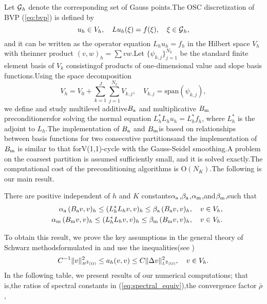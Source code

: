 \documentclass{report}
\begin{document}
Let $\mbox{${\cal G}$}_h$ denote the corresponding set of Gauss points.The OSC discretization of BVP (\ref{eq:bvp}) is defined by\begin{equation}\label{eq:osc}u_h\in V_h,\quad Lu_h(\xi)=f(\xi),\quad\xi\in\mbox{${\cal G}$}_h,\end{equation}and it can be written as the operator equation $L_hu_h=f_h$ in the Hilbert space $V_h$ with theinner product $(v,w)_h=\sum vw$.Let $\{\psi_{k,j}\}_{j=1}^{N_k}$ be the standard finite element basis of $V_k$ consistingof products of one-dimensional value and slope basis functions.Using the space decomposition\[V_h=V_0+\sum_{k=1}^{J}\sum_{j=1}^{N_k}V_{k,j},
\quad V_{k,j} = \mbox{span}(\psi_{k,j}),\]we define and study multilevel additive$B_{\textup{\scriptsize a}}$ and multiplicative $B_{\textup{\scriptsize m}}$ preconditionersfor solving the normal equation $L_h^*L_hu_h=L_h^*f_h$,
where $L_h^*$ is the adjoint to $L_h$.The implementation of $B_{\textup{\scriptsize a}}$ and $B_{\textup{\scriptsize m}}$is based on relationships between basis functions for two consecutive partitionsand the implementation of $B_{\textup{\scriptsize m}}$ is similar to that forV(1,1)-cycle with the Gauss-Seidel smoothing.A problem on the coarsest partition is assumed sufficiently small,
and it is solved exactly.The computational cost of the preconditioning algorithms is $\mbox{O}(N_K)$.The following is our main result.\begin{theorem}There are positive independent of $h$ and $K$ constants$\alpha_{\textup{\scriptsize a}}$,$\beta_{\textup{\scriptsize a}}$,$\alpha_{\textup{\scriptsize m}}$,and$\beta_{\textup{\scriptsize m}}$,such that\begin{eqnarray}\label{eq:spectral_equiv}&&\alpha_{\textup{\scriptsize a}}\,
(B_{\textup{\scriptsize a}}v,v)_h\leq (L_h^*L_hv,v)_h \leq\beta_{\textup{\scriptsize a}}\,
(B_{\textup{\scriptsize a}}v,v)_h,\quad v\in V_h,\\\nonumber&&\alpha_{\textup{\scriptsize m}}\,
(B_{\textup{\scriptsize m}}v,v)_h\leq (L_h^*L_hv,v)_h \leq\beta_{\textup{\scriptsize m}}\,
(B_{\textup{\scriptsize m}}v,v)_h,\quad v\in V_h.\end{eqnarray}\end{theorem}To obtain this result,
we prove the key assumptions in the general theory of Schwarz methodsformulated in \cite{SBG_1996} and use the inequalities(see \cite{Bialecki_1998})\[C^{-1}\|v\|_{\mbox{$\scriptscriptstyle H^{2}(\Omega)$}}^2\leq a_h(v,v)\leq C\|\Delta v\|_{\mbox{$\scriptscriptstyle L^{2}(\Omega)$}}^2,\quad v\in V_h.\]In the following table,
we present results of our numerical computations;
that is,the ratios of spectral constants in (\ref{eq:spectral_equiv}),the convergence factor $\bar{\rho}$,
\end{document}
